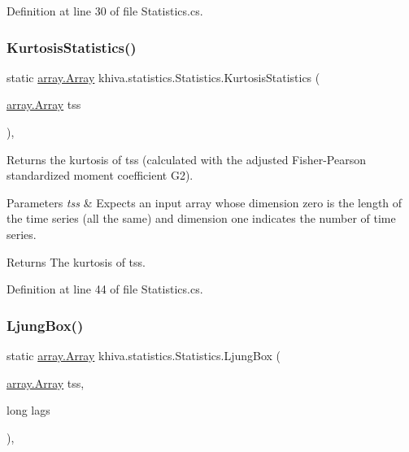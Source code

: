 Definition at line 30 of file Statistics.\+cs.

\mbox{\label{classkhiva_1_1statistics_1_1_statistics_ab96b6c235e6ea20c702067c28473802b}} 
\subsubsection{\texorpdfstring{Kurtosis\+Statistics()}{KurtosisStatistics()}}
{\footnotesize\ttfamily static \mbox{\hyperlink{classkhiva_1_1array_1_1_array}{array.\+Array}} khiva.\+statistics.\+Statistics.\+Kurtosis\+Statistics (\begin{DoxyParamCaption}\item[{\mbox{\hyperlink{classkhiva_1_1array_1_1_array}{array.\+Array}}}]{tss }\end{DoxyParamCaption})\hspace{0.3cm}{\ttfamily [inline]}, {\ttfamily [static]}}



Returns the kurtosis of tss (calculated with the adjusted Fisher-\/\+Pearson standardized moment coefficient G2). 


\begin{DoxyParams}{Parameters}
{\em tss} & Expects an input array whose dimension zero is the length of the time series (all the same) and dimension one indicates the number of time series.\\
\hline
\end{DoxyParams}
\begin{DoxyReturn}{Returns}
The kurtosis of tss.
\end{DoxyReturn}


Definition at line 44 of file Statistics.\+cs.

\mbox{\label{classkhiva_1_1statistics_1_1_statistics_a1ac4be386c872cf4db7119e62bac0e32}} 
\subsubsection{\texorpdfstring{Ljung\+Box()}{LjungBox()}}
{\footnotesize\ttfamily static \mbox{\hyperlink{classkhiva_1_1array_1_1_array}{array.\+Array}} khiva.\+statistics.\+Statistics.\+Ljung\+Box (\begin{DoxyParamCaption}\item[{\mbox{\hyperlink{classkhiva_1_1array_1_1_array}{array.\+Array}}}]{tss,  }\item[{long}]{lags }\end{DoxyParamCaption})\hspace{0.3cm}{\ttfamily [inline]}, {\ttfamily [static]}}



